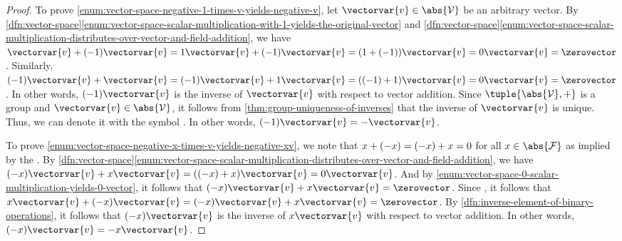 \begin{proof}
    \vspace{0.3cm}
    \noindent
    To prove \ref{enum:vector-space-negative-1-times-v-yields-negative-v}, let \( \vectorvar{v} \in \abs{\mathcal{V}} \) be an arbitrary vector.
    By \cref{dfn:vector-space}\ref{enum:vector-space-scalar-multiplication-with-1-yields-the-original-vector} and
    \cref{dfn:vector-space}\ref{enum:vector-space-scalar-multiplication-distributes-over-vector-and-field-addition}, we have
    \( \vectorvar{v} + \mleft( -1 \mright)\vectorvar{v} = 1\vectorvar{v} + \mleft( -1 \mright)\vectorvar{v}
    = \mleft( 1 + \mleft( -1 \mright) \mright)\vectorvar{v} = 0\vectorvar{v} = \zerovector \). Similarly,
    \( \mleft( -1 \mright)\vectorvar{v} + \vectorvar{v} = \mleft( -1 \mright)\vectorvar{v} + 1\vectorvar{v}
    = \mleft( \mleft( -1 \mright) + 1 \mright)\vectorvar{v} = 0\vectorvar{v} = \zerovector \). In other words,
    \( \mleft( -1 \mright)\vectorvar{v} \) is the inverse of \( \vectorvar{v} \) with respect to
    vector addition. Since \( \tuple{\abs{\mathcal{V}}, +} \) is a group and \( \vectorvar{v} \in \abs{\mathcal{V}} \),
    it follows from \cref{thm:group-uniqueness-of-inverses} that the inverse of \( \vectorvar{v} \) is unique. Thus, we can denote
    it with the symbol .
    In other words, \( \mleft( -1 \mright)\vectorvar{v} = -\vectorvar{v} \).

    \vspace{0.3cm}
    \noindent
    To prove \ref{enum:vector-space-negative-x-times-v-yields-negative-xv}, we note that
    \( x + \mleft( -x \mright) = \mleft( -x \mright) + x = 0 \) for all \( x \in \abs{\mathcal{F}} \)
    as implied by the . By \cref{dfn:vector-space}\ref{enum:vector-space-scalar-multiplication-distributes-over-vector-and-field-addition},
    we have \( \mleft( -x \mright)\vectorvar{v} + x\vectorvar{v} = \mleft( \mleft( -x \mright) + x \mright)\vectorvar{v} = 0\vectorvar{v} \).
    And by \ref{enum:vector-space-0-scalar-multiplication-yields-0-vector}, it follows that \( \mleft( -x \mright)\vectorvar{v} + x\vectorvar{v} = \zerovector \).
    Since , it follows that
    \( x\vectorvar{v} + \mleft( -x \mright)\vectorvar{v} = \mleft( -x \mright)\vectorvar{v} + x\vectorvar{v} = \zerovector \).
    By \cref{dfn:inverse-element-of-binary-operations}, it follows that \( \mleft( -x \mright)\vectorvar{v} \) is the inverse of \( x\vectorvar{v} \) with respect
    to vector addition. In other words, \( \mleft( -x \mright)\vectorvar{v} = -x\vectorvar{v} \).


\end{proof}
